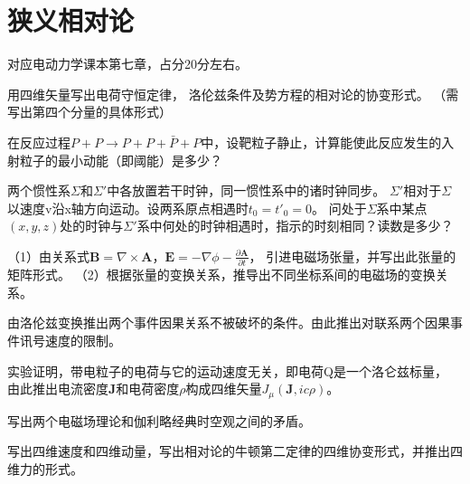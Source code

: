 \section{狭义相对论}
对应电动力学课本第七章，占分20分左右。

\begin{question}
    用四维矢量写出电荷守恒定律，
    洛伦兹条件及势方程的相对论的协变形式。
    （需写出第四个分量的具体形式）
\end{question}

\begin{question}
    在反应过程$P+P\rightarrow P+P+\bar P+P$中，设靶粒子静止，计算能使此反应发生的入射粒子的最小动能（即阈能）是多少？
\end{question}

\begin{question}
    两个惯性系$\Sigma $和$\Sigma' $中各放置若干时钟，同一惯性系中的诸时钟同步。
    $\Sigma '$相对于$\Sigma $以速度v沿x轴方向运动。设两系原点相遇时$t_0=t'_0=0$。
    问处于$\Sigma$系中某点$(x,y,z)$处的时钟与$\Sigma' $系中何处的时钟相遇时，指示的时刻相同？读数是多少？
\end{question}

\begin{question}
    （1）由关系式$\mathbf{B}=\nabla \times \mathbf{A}$，$\mathbf{E}=-\nabla \phi-\frac{\partial\mathbf{A}}{\partial t}$，
    引进电磁场张量，并写出此张量的矩阵形式。
    （2）根据张量的变换关系，推导出不同坐标系间的电磁场的变换关系。
\end{question}

\begin{question}
    由洛伦兹变换推出两个事件因果关系不被破坏的条件。由此推出对联系两个因果事件讯号速度的限制。
\end{question}

\begin{question}
    实验证明，带电粒子的电荷与它的运动速度无关，即电荷Q是一个洛仑兹标量，
    由此推出电流密度$\mathbf{J}$和电荷密度$\rho$构成四维矢量$J_\mu(\mathbf{J},i c \rho)$。
\end{question}

\begin{question}
    写出两个电磁场理论和伽利略经典时空观之间的矛盾。
\end{question}

\begin{question}
    写出四维速度和四维动量，写出相对论的牛顿第二定律的四维协变形式，并推出四维力的形式。
\end{question}

